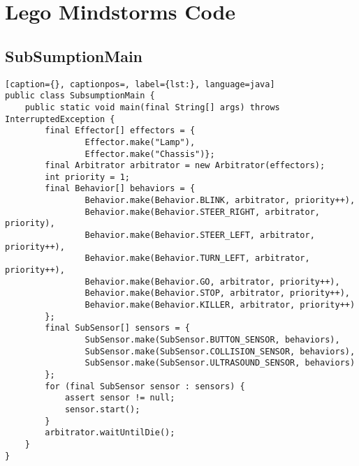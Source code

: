 \chapter{Lego Mindstorms Code}
\vspace{-40px}
\section{SubSumptionMain}
\begin{lstlisting}[caption={}, captionpos=, label={lst:}, language=java]
public class SubsumptionMain {
    public static void main(final String[] args) throws InterruptedException {
        final Effector[] effectors = {
                Effector.make("Lamp"),
                Effector.make("Chassis")};
        final Arbitrator arbitrator = new Arbitrator(effectors);
        int priority = 1;
        final Behavior[] behaviors = {
				Behavior.make(Behavior.BLINK, arbitrator, priority++),
				Behavior.make(Behavior.STEER_RIGHT, arbitrator, priority),
				Behavior.make(Behavior.STEER_LEFT, arbitrator, priority++),
				Behavior.make(Behavior.TURN_LEFT, arbitrator, priority++),
                Behavior.make(Behavior.GO, arbitrator, priority++),
                Behavior.make(Behavior.STOP, arbitrator, priority++),
                Behavior.make(Behavior.KILLER, arbitrator, priority++)
        };
        final SubSensor[] sensors = {
                SubSensor.make(SubSensor.BUTTON_SENSOR, behaviors),
                SubSensor.make(SubSensor.COLLISION_SENSOR, behaviors),
                SubSensor.make(SubSensor.ULTRASOUND_SENSOR, behaviors)
        };
        for (final SubSensor sensor : sensors) {
            assert sensor != null;
            sensor.start();
        }
        arbitrator.waitUntilDie();
    }
}
\end{lstlisting}

